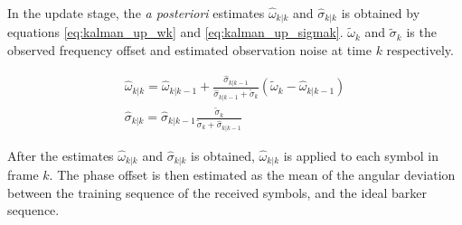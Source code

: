 In the update stage, the \textit{a posteriori} estimates $\widehat{\omega}_{k | k}$ and $\widehat{\sigma}_{k | k}$ is obtained by equations \ref{eq:kalman_up_wk} and \ref{eq:kalman_up_sigmak}. $\widetilde{\omega}_k$ and $\widetilde{\sigma}_{k}$ is the observed frequency offset and estimated observation noise at time $k$ respectively.

\begin{gather}
\widehat{\omega}_{k | k} = \widehat{\omega}_{k | k-1} + \frac{\widehat{\sigma}_{k | k-1}}{\widehat{\sigma}_{k | k-1} + \widetilde{\sigma}_{k}} ( \widetilde{\omega}_{k} - \widehat{\omega}_{k | k-1} )  \label{eq:kalman_up_wk} \\
\widehat{\sigma}_{k | k} = \widehat{\sigma}_{k | k-1} \frac{\widetilde{\sigma}_{k}}{\widetilde{\sigma}_{k} + \widehat{\sigma}_{k | k-1}  } \label{eq:kalman_up_sigmak} 
\end{gather} 

After the estimates $\widehat{\omega}_{k | k}$ and $\widehat{\sigma}_{k | k}$ is obtained, $\widehat{\omega}_{k | k}$ is applied to each symbol in frame $k$. The phase offset is then estimated as the mean of the angular deviation between the training sequence of the received symbols, and the ideal barker sequence.


